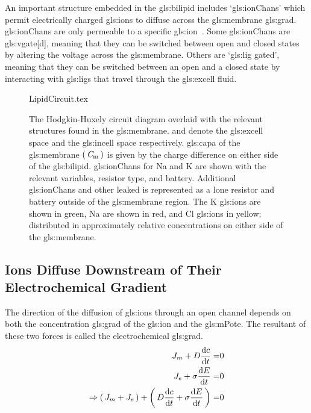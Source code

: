 \documentclass[class={myRUCProject}, crop=false]{standalone}
\begin{document}
An important structure embedded in the \gls{gls:bilipid} includes `\glspl{gls:ionChan}' which permit electrically charged \glspl{gls:ion} to diffuse across the \gls{gls:membrane} \gls{gls:grad}. \Glspl{gls:ionChan} are only permeable to a specific \gls{gls:ion}~\cite{}. Some \glspl{gls:ionChan} are \gls{gls:vgate}[d], meaning that they can be switched between open and closed states by altering the voltage across the \gls{gls:membrane}. 
Others are `\gls{gls:lig} gated', meaning that they can be switched between an open and a closed state by interacting with \glspl{gls:lig} that travel through the \gls{gls:excell} fluid. 

\vspace{1em}

\begin{figure}[H]
    \centering
    {LipidCircuit.tex}
    \caption{The Hodgkin-Huxely circuit diagram overlaid with the relevant structures found in the \gls{gls:membrane}.  and  denote the \gls{gls:excell} space and the \gls{gls:incell} space respectively. \Gls{gls:capa} of the \gls{gls:membrane} \(\left(\,\mathit{C}_\mathrm{m}\,\right)\) is given by the charge difference on either side of the \gls{gls:bilipid}. \Glspl{gls:ionChan} for \gls{Na} and \gls{K} are shown with the relevant variables, resistor type, and battery. Additional \glspl{gls:ionChan} and other leaked is represented as a lone resistor and battery outside of the \gls{gls:membrane} region. The \gls{K} \glspl{gls:ion} are shown in green, \gls{Na} are shown in red, and \gls{Cl} \glspl{gls:ion} in yellow; distributed in approximately relative concentrations on either side of the \gls{gls:membrane}. }\label{fig:MembraneCircut}
\end{figure}


\subsection{Ions Diffuse Downstream of Their Electrochemical Gradient}


The direction of the diffusion of \glspl{gls:ion} through an open channel depends on both the concentration \gls{gls:grad} of the \gls{gls:ion} and the \gls{gls:mPote}. The resultant of these two forces is called the electrochemical \gls{gls:grad}.
\begin{align}
    J_m + D\frac{\mathrm{d}\displaystyle c}{\mathrm{d}\displaystyle t} =& 0\\
    J_e + \sigma\frac{\mathrm{d}\displaystyle E}{\mathrm{d}\displaystyle t} =& 0\\
    \Rightarrow \left(\,J_m + J_e\,\right) + \left(\,D\frac{\mathrm{d}\displaystyle c}{\mathrm{d}\displaystyle t} + \sigma\frac{\mathrm{d}\displaystyle E}{\mathrm{d}\displaystyle t}\,\right) =& 0
\end{align}
\end{document}
